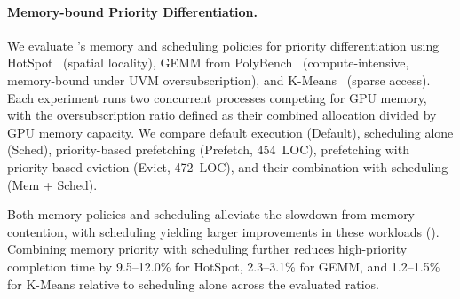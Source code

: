 % 
% 

\paragraph{Memory-bound Priority Differentiation.}
We evaluate \sys's memory and scheduling policies for priority differentiation using HotSpot~\cite{che2009rodinia} (spatial locality), GEMM from PolyBench~\cite{grauer2012auto} (compute-intensive, memory-bound under UVM oversubscription), and K-Means~\cite{gu2020uvmbench} (sparse access).
Each experiment runs two concurrent processes competing for GPU memory, with the oversubscription ratio defined as their combined allocation divided by GPU memory capacity.
We compare default execution (Default), scheduling alone (Sched), priority-based prefetching (Prefetch, 454~LOC), prefetching with priority-based eviction (Evict, 472~LOC), and their combination with scheduling (Mem + Sched).

Both memory policies and scheduling alleviate the slowdown from memory contention, with scheduling yielding larger improvements in these workloads ().
Combining memory priority with scheduling further reduces high-priority completion time by 9.5--12.0\% for HotSpot, 2.3--3.1\% for GEMM, and 1.2--1.5\% for K-Means relative to scheduling alone across the evaluated ratios.

